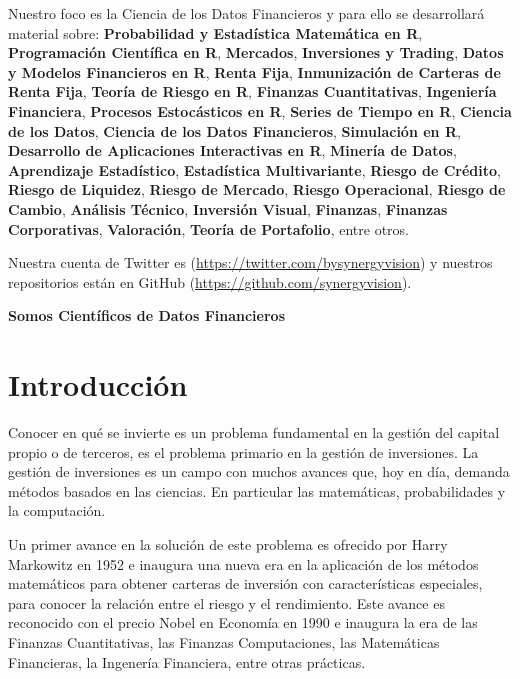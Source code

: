 \documentclass[
  12pt,
]{krantz}
\begin{document}
Nuestro foco es la Ciencia de los Datos Financieros y para ello se desarrollará material sobre: \textbf{Probabilidad y Estadística Matemática en R}, \textbf{Programación Científica en R}, \textbf{Mercados}, \textbf{Inversiones y Trading}, \textbf{Datos y Modelos Financieros en R}, \textbf{Renta Fija}, \textbf{Inmunización de Carteras de Renta Fija}, \textbf{Teoría de Riesgo en R}, \textbf{Finanzas Cuantitativas}, \textbf{Ingeniería Financiera}, \textbf{Procesos Estocásticos en R}, \textbf{Series de Tiempo en R}, \textbf{Ciencia de los Datos}, \textbf{Ciencia de los Datos Financieros}, \textbf{Simulación en R}, \textbf{Desarrollo de Aplicaciones Interactivas en R}, \textbf{Minería de Datos}, \textbf{Aprendizaje Estadístico}, \textbf{Estadística Multivariante}, \textbf{Riesgo de Crédito}, \textbf{Riesgo de Liquidez}, \textbf{Riesgo de Mercado}, \textbf{Riesgo Operacional}, \textbf{Riesgo de Cambio}, \textbf{Análisis Técnico}, \textbf{Inversión Visual}, \textbf{Finanzas}, \textbf{Finanzas Corporativas}, \textbf{Valoración}, \textbf{Teoría de Portafolio}, entre otros.

Nuestra cuenta de Twitter es (\url{https://twitter.com/bysynergyvision}) y nuestros repositorios están en GitHub (\url{https://github.com/synergyvision}).

\textbf{Somos Científicos de Datos Financieros}

\mainmatter

\hypertarget{introduccion}{%
\chapter{Introducción}\label{introduccion}}

Conocer en qué se invierte es un problema fundamental en la gestión del capital propio o de terceros, es el problema primario en la gestión de inversiones. La gestión de inversiones es un campo con muchos avances que, hoy en día, demanda métodos basados en las ciencias. En particular las matemáticas, probabilidades y la computación.

Un primer avance en la solución de este problema es ofrecido por Harry Markowitz en 1952 e inaugura una nueva era en la aplicación de los métodos matemáticos para obtener carteras de inversión con características especiales, para conocer la relación entre el riesgo y el rendimiento. Este avance es reconocido con el precio Nobel en Economía en 1990 e inaugura la era de las Finanzas Cuantitativas, las Finanzas Computaciones, las Matemáticas Financieras, la Ingenería Financiera, entre otras prácticas.
\end{document}
